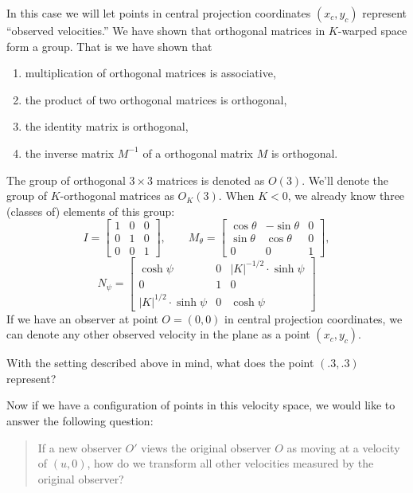 \documentclass[12pt,noauthor,nooutcomes,handout,newpage]{ximera}
\begin{document}
In this case we will let points in central projection coordinates
$(x_c,y_c)$ represent ``observed velocities.'' We have shown that
orthogonal matrices in $K$-warped space form a group. That is we have
shown that
\begin{enumerate}
\item multiplication of orthogonal matrices is associative, 
\item the product of two orthogonal matrices is orthogonal,
\item the identity matrix is orthogonal,
\item the inverse matrix $M^{-1}$ of a orthogonal matrix $M$ is orthogonal.
\end{enumerate}
The group of orthogonal $3\times 3$ matrices is denoted as
$O(3)$. We'll denote the group of $K$-orthogonal matrices as
$O_K(3)$. When $K<0$, we already know three (classes of) elements of this group:
\[
I =
\begin{bmatrix}
  1 & 0 & 0\\
  0 & 1 & 0\\
  0 & 0 & 1
\end{bmatrix},
\qquad
M_\theta=
\begin{bmatrix}
  \cos\theta & -\sin\theta & 0\\
  \sin\theta & \cos\theta & 0\\
  0 & 0 & 1
\end{bmatrix},
\]
\[
N_\psi=\begin{bmatrix}
\cosh\psi & 0 & |K|^{-1/2}\cdot\sinh\psi\\
0 & 1 & 0\\
|K|^{1/2}\cdot\sinh\psi & 0 & \cosh\psi
\end{bmatrix}
\]
If we have an observer at point $O = (0,0)$ in central projection
coordinates, we can denote any other observed velocity in the plane as
a point $(x_c,y_c)$.

\begin{problem}
  With the setting described above in mind, what does the point
  $(.3,.3)$ represent?
\end{problem}

Now if we have a configuration of points in this velocity space, we
would like to answer the following question:

\begin{quote}
  If a new observer $O'$ views the original observer $O$ as moving at
  a velocity of $(u,0)$, how do we transform all other velocities
  measured by the original observer?
\end{quote}
\end{document}
